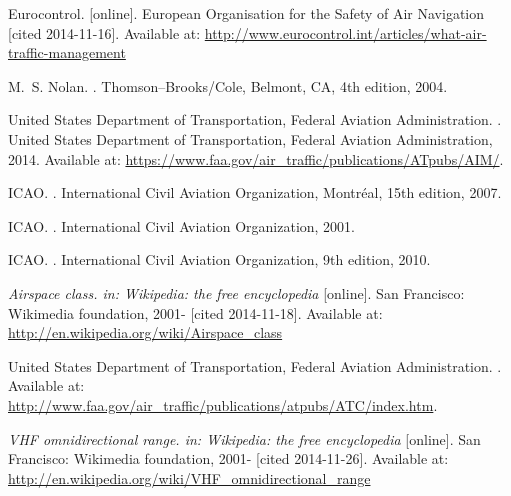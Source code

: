 \begin{thebibliography}{1}

Eurocontrol.
 [online].
\newblock European Organisation for the Safety of Air Navigation [cited 2014-11-16].
\newblock Available at: \url{http://www.eurocontrol.int/articles/what-air-traffic-management}

M.~S. Nolan.
.
\newblock Thomson--Brooks/Cole, Belmont, CA, 4th edition, 2004.

United States Department of Transportation, Federal Aviation Administration.
.
\newblock United States Department of Transportation, Federal Aviation Administration, 2014.
\newblock Available at: \url{https://www.faa.gov/air_traffic/publications/ATpubs/AIM/}.

ICAO.
.
\newblock International Civil Aviation Organization, Montréal, 15th edition, 2007.

ICAO.
.
\newblock International Civil Aviation Organization, 2001.

ICAO.
.
\newblock International Civil Aviation Organization, 9th edition, 2010.

{\em Airspace class. in: Wikipedia: the free encyclopedia} [online].
\newblock San Francisco: Wikimedia foundation, 2001- [cited 2014-11-18].
\newblock Available at: \url{http://en.wikipedia.org/wiki/Airspace_class}

United States Department of Transportation, Federal Aviation Administration.
.
\newblock Available at: \url{http://www.faa.gov/air_traffic/publications/atpubs/ATC/index.htm}.

{\em VHF omnidirectional range. in: Wikipedia: the free encyclopedia} [online].
\newblock San Francisco: Wikimedia foundation, 2001- [cited 2014-11-26].
\newblock Available at: \url{http://en.wikipedia.org/wiki/VHF_omnidirectional_range}


\end{thebibliography}
